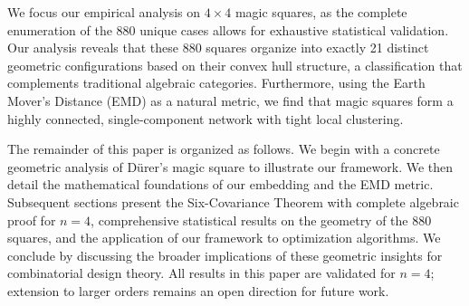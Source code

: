 We focus our empirical analysis on $4 \times 4$ magic squares, as the complete enumeration of the 880 unique cases allows for exhaustive statistical validation. Our analysis reveals that these 880 squares organize into exactly 21 distinct geometric configurations based on their convex hull structure, a classification that complements traditional algebraic categories. Furthermore, using the Earth Mover's Distance (EMD) as a natural metric, we find that magic squares form a highly connected, single-component network with tight local clustering.

The remainder of this paper is organized as follows. We begin with a concrete geometric analysis of Dürer's magic square to illustrate our framework. We then detail the mathematical foundations of our embedding and the EMD metric. Subsequent sections present the Six-Covariance Theorem with complete algebraic proof for $n=4$, comprehensive statistical results on the geometry of the 880 squares, and the application of our framework to optimization algorithms. We conclude by discussing the broader implications of these geometric insights for combinatorial design theory. All results in this paper are validated for $n=4$; extension to larger orders remains an open direction for future work.
